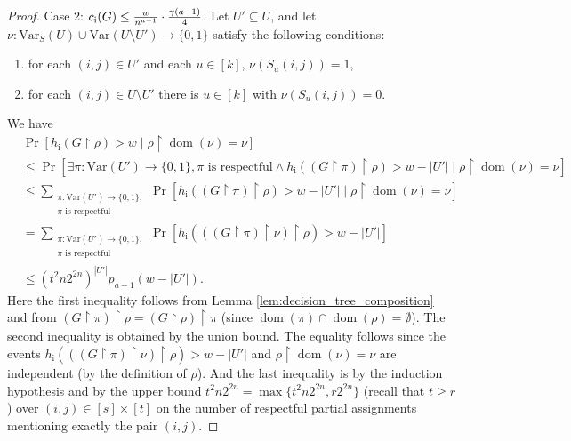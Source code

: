 \documentclass[10pt,a4paper]{article}
\theoremstyle{remark}
\newtheorem*{switching lemma}{Switching Lemma}
\newtheorem*{open problem}{Open Problem}
\theoremstyle{definition}
\DeclareMathOperator{\dom}{dom}
\begin{document}
\begin{proof}
Case 2: $c_{\textnormal{i}}(G) \leq \frac{w}{n^{a-1}} \cdot \frac{\gamma(a-1)}{4}$. 
Let $U' \subseteq U$, and let $\nu : \text{Var}_S(U) \cup \text{Var}(U \setminus U') \rightarrow \{0,1\}$ satisfy the following conditions:
\begin{enumerate}[($\nu$1)]
\item \label{item:nu_1_on_U'} for each $(i,j) \in U'$ and each $u \in [k]$, $\nu(S_u(i,j)) = 1$, 
\item \label{item:nu_0_outside_U'} for each $(i,j) \in U \setminus U'$ there is $u \in [k]$ with $\nu(S_u(i,j)) = 0$.
\end{enumerate}  
We have
\begin{align*}
& \Pr[h_{\text{i}}(G \! \restriction \! \rho) > w \mid \rho \! \restriction \! \dom(\nu) = \nu]  \\
& \leq \Pr [ \exists \pi : \text{Var}(U') \rightarrow \{0,1\}, \pi \text{ is respectful} \land h_{\text{i}}((G \! \restriction \! \pi) \! \restriction \! \rho) > w - |U'| \mid \rho \! \restriction \! \dom(\nu) = \nu] \\
& \leq   \sum_{\substack{\pi : \text{Var}(U') \rightarrow \{0,1\}, \\ \pi \text{ is respectful}}} \Pr [h_{\text{i}}((G \! \restriction \! \pi) \! \restriction \! \rho) > w- |U'| \mid \rho \! \restriction \! \dom(\nu) = \nu] \\
& = \sum_{\substack{\pi : \text{Var}(U') \rightarrow \{0,1\}, \\ \pi \text{ is respectful}}} \Pr [h_{\text{i}}(((G \! \restriction \! \pi) \! \restriction \!  \nu) \! \restriction \! \rho) > w- |U'|] \\
& \leq \left(t^2 n 2^{2n} \right)^{|U'|} p_{a-1}(w - |U'|).
\end{align*}
Here the first inequality follows from Lemma \ref{lem:decision_tree_composition} and from $(G \! \restriction \! \pi) \! \restriction \! \rho = (G \! \restriction \! \rho) \! \restriction \! \pi$ (since $\dom(\pi) \cap \dom(\rho) = \emptyset$). The second inequality is obtained by the union bound. The equality follows since the events $h_{\text{i}}(((G \! \restriction \! \pi) \! \restriction \! \nu) \! \restriction \! \rho) > w- |U'|$ and $\rho \! \restriction \! \dom(\nu) = \nu$ are independent (by the definition of $\rho$). And the last inequality is by the induction hypothesis and by the upper bound $t^2n2^{2n} = \max \{t^2n2^{2n}, r2^{2n} \}$ (recall that $t \geq r$) over $(i,j) \in [s] \times [t]$ on the number of respectful partial assignments mentioning exactly the pair $(i,j)$.  


\end{proof}
\end{document}
